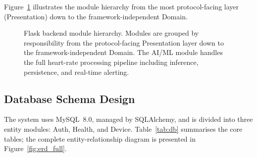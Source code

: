 Figure~\ref{fig:clean_arch} illustrates the module hierarchy from the most protocol-facing layer (Presentation) down to the framework-independent Domain.

\begin{figure}[H]
\centering
{}
\caption[Flask backend module hierarchy]{Flask backend module hierarchy. Modules are grouped by responsibility from the protocol-facing Presentation layer down to the framework-independent Domain. The AI/ML module handles the full heart-rate processing pipeline including inference, persistence, and real-time alerting.}
\label{fig:clean_arch}
\end{figure}

\FloatBarrier

\subsection{Database Schema Design}

The system uses MySQL~8.0, managed by SQLAlchemy, and is divided into three entity modules: Auth, Health, and Device. Table~\ref{tab:db} summarises the
core tables; the complete entity-relationship diagram is presented in
Figure~\ref{fig:erd_full}.


